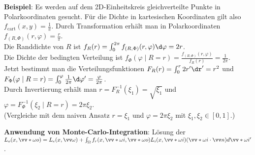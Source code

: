 \textbf{Beispiel}:
Es werden auf dem 2D-Einheitskreis gleichverteilte Punkte in Polarkoordinaten gesucht.
Für die Dichte in kartesischen Koordinaten gilt also $f_{\text{cart}}(x, y) = \frac{1}{\pi}$.
Durch Transformation erhält man in Polarkoordinaten $f_{(R,\Phi)}(r, \varphi) = \frac{r}{\pi}$.\\
Die Randdichte von $R$ ist
$f_R(r) = \int_0^{2\pi} f_{(R,\Phi)}(r, \varphi) \d\varphi = 2r$.\\
Die Dichte der bedingten Verteilung ist
$f_\Phi(\varphi\;|\;R = r) = \frac{f_{(R,\Phi)}(r, \varphi)}{f_R(r)} = \frac{1}{2\pi}$.\\
Jetzt bestimmt man die Verteilungsfunktionen
$F_R(r) = \int_0^r 2r' \dr' = r^2$ und\\
$F_\Phi(\varphi\;|\;R = r) = \int_0^\varphi \frac{1}{2\pi} \d\varphi' = \frac{\varphi}{2\pi}$.\\
Durch Invertierung erhält man $r = F_R^{-1}(\xi_1) = \sqrt{\xi_1}$ und
$\varphi = F_\Phi^{-1}(\xi_2\;|\;R = r) = 2\pi\xi_2$.\\
(Vergleiche mit dem naiven Ansatz $r = \xi_1$ und $\varphi = 2\pi\xi_2$ mit
$\xi_1, \xi_2 \in [0, 1]$.)

\linie

\textbf{Anwendung von Monte-Carlo-Integration}:
Lösung der \\
$L_o(x, \vecs{\omega}{o}) = L_e(x, \vec{\omega}) +
\int_\Omega f_r(x, \vecs{\omega}{i}, \vecs{\omega}{o}) L_i(x, \vecs{\omega}{i})
(\vecs{\omega}{i} \cdot \vec{n}) d\vecs{\omega}{i}'$.

\pagebreak
